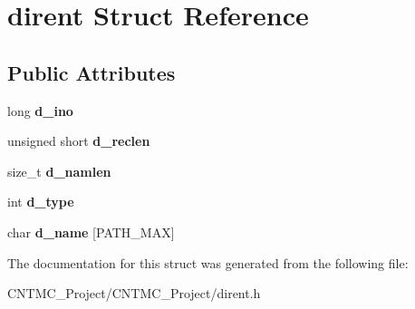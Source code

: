 \hypertarget{structdirent}{}\section{dirent Struct Reference}
\label{structdirent}
\subsection*{Public Attributes}
\begin{DoxyCompactItemize}
\item 
\hypertarget{structdirent_acb6fecfb0e0f6fdc226dff8d56c3da4a}{}long {\bfseries d\+\_\+ino}\label{structdirent_acb6fecfb0e0f6fdc226dff8d56c3da4a}

\item 
\hypertarget{structdirent_a90dc47836e8ef510437317876368859e}{}unsigned short {\bfseries d\+\_\+reclen}\label{structdirent_a90dc47836e8ef510437317876368859e}

\item 
\hypertarget{structdirent_a09ced068b03cdb339e34840c8b709621}{}size\+\_\+t {\bfseries d\+\_\+namlen}\label{structdirent_a09ced068b03cdb339e34840c8b709621}

\item 
\hypertarget{structdirent_ad6a736cb04c7295e8f97f708324b3500}{}int {\bfseries d\+\_\+type}\label{structdirent_ad6a736cb04c7295e8f97f708324b3500}

\item 
\hypertarget{structdirent_a6c68ac080755453ec52de202e91de59b}{}char {\bfseries d\+\_\+name} \mbox{[}P\+A\+T\+H\+\_\+\+M\+A\+X\mbox{]}\label{structdirent_a6c68ac080755453ec52de202e91de59b}

\end{DoxyCompactItemize}


The documentation for this struct was generated from the following file\+:\begin{DoxyCompactItemize}
\item 
C\+N\+T\+M\+C\+\_\+\+Project/\+C\+N\+T\+M\+C\+\_\+\+Project/dirent.\+h\end{DoxyCompactItemize}
